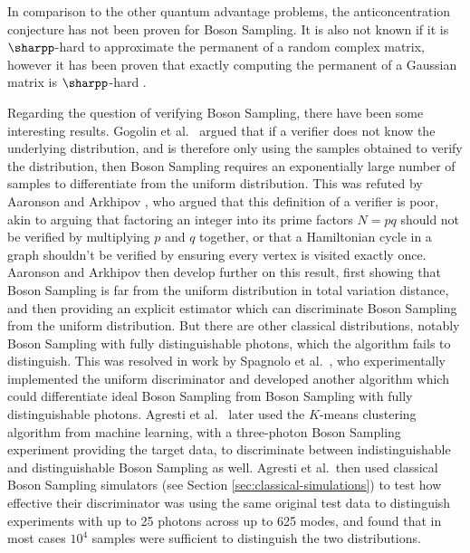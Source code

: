 In comparison to the other quantum advantage problems, the anticoncentration conjecture has not been proven for Boson Sampling. It is also not known if it is $\sharpp$-hard to approximate the permanent of a random complex matrix, however it has been proven that exactly computing the permanent of a Gaussian matrix is $\sharpp$-hard \cite{aaronson2010report, aaronson2011}.

Regarding the question of verifying Boson Sampling, there have been some interesting results. Gogolin et al.~\cite{gogolin2013} argued that if a verifier does not know the underlying distribution, and is therefore only using the samples obtained to verify the distribution, then Boson Sampling requires an exponentially large number of samples to differentiate from the uniform distribution. This was refuted by Aaronson and Arkhipov \cite{aaronson2014}, who argued that this definition of a verifier is poor, akin to arguing that factoring an integer into its prime factors $N=pq$ should not be verified by multiplying $p$ and $q$ together, or that a Hamiltonian cycle in a graph shouldn't be verified by ensuring every vertex is visited exactly once. Aaronson and Arkhipov then develop further on this result, first showing that Boson Sampling is far from the uniform distribution in total variation distance, and then providing an explicit estimator which can discriminate Boson Sampling from the uniform distribution. But there are other classical distributions, notably Boson Sampling with fully distinguishable photons, which the algorithm fails to distinguish. This was resolved in work by Spagnolo et al.~\cite{spagnolo2014}, who experimentally implemented the uniform discriminator and developed another algorithm which could differentiate ideal Boson Sampling from Boson Sampling with fully distinguishable photons. Agresti et al.~\cite{agresti2019} later used the $K$-means clustering algorithm from machine learning, with a three-photon Boson Sampling experiment providing the target data, to discriminate between indistinguishable and distinguishable Boson Sampling as well. Agresti et al.\ then used classical Boson Sampling simulators (see Section \ref{sec:classical-simulations}) to test how effective their discriminator was using the same original test data to distinguish experiments with up to 25 photons across up to 625 modes, and found that in most cases $10^4$ samples were sufficient to distinguish the two distributions.

